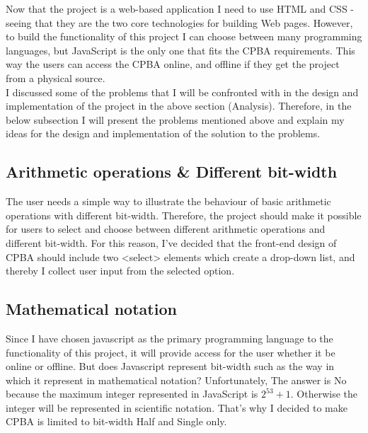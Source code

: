 \documentclass[11pt]{article}
\begin{document}
Now that the project is a web-based application I need to use HTML and CSS - seeing that they are the two core technologies for building Web pages. However, to build the functionality of this project I can choose between many programming languages, but JavaScript is the only one that fits the CPBA requirements. This way the users can access the CPBA online, and offline if they get the project from a physical source.\\

I discussed some of the problems that I will be confronted with in the design and implementation of the project in the above section (Analysis). Therefore, in the below subsection I will present the problems mentioned above and explain my ideas for the design and implementation of the solution to the problems.
\subsection{Arithmetic operations \& Different bit-width}
The user needs a simple way to illustrate the behaviour of basic arithmetic operations with different bit-width. Therefore, the project should make it possible for users to select and choose between different arithmetic operations and different bit-width. For this reason, I've decided that the front-end design of CPBA should include  two  <select> elements which create a drop-down list, and thereby I collect user input from the selected option.
\subsection{Mathematical notation}
Since I have chosen javascript as the primary programming language to the functionality of this project, it will provide access for the user whether it be online or offline. But does Javascript represent bit-width such as the way in which it represent in mathematical notation? Unfortunately, The answer is No because the maximum integer represented in JavaScript is $2^{53}+1$. Otherwise the integer will be represented in scientific notation. That's why I decided to make CPBA is limited to bit-width Half and Single only.
\end{document}
